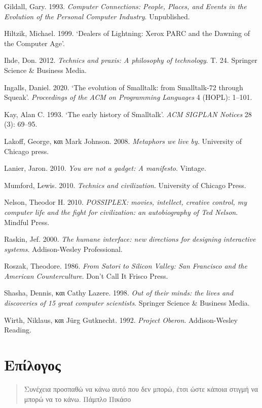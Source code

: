 \documentclass[
]{article}
\begin{document}
Gildall, Gary. 1993. \emph{Computer Connections: People, Places, and
Events in the Evolution of the Personal Computer Industry}. Unpublished.

Hiltzik, Michael. 1999. {`Dealers of Lightning: Xerox PARC and the
Dawning of the Computer Age'}.

Ihde, Don. 2012. \emph{Technics and praxis: A philosophy of technology}.
Τ. 24. Springer Science \& Business Media.

Ingalls, Daniel. 2020. {`The evolution of Smalltalk: from Smalltalk-72
through Squeak'}. \emph{Proceedings of the ACM on Programming Languages}
4 (HOPL): 1--101.

Kay, Alan C. 1993. {`The early history of Smalltalk'}. \emph{ACM SIGPLAN
Notices} 28 (3): 69--95.

Lakoff, George, και Mark Johnson. 2008. \emph{Metaphors we live by}.
University of Chicago press.

Lanier, Jaron. 2010. \emph{You are not a gadget: A manifesto}. Vintage.

Mumford, Lewis. 2010. \emph{Technics and civilization}. University of
Chicago Press.

Nelson, Theodor H. 2010. \emph{POSSIPLEX: movies, intellect, creative
control, my computer life and the fight for civilization: an
autobiography of Ted Nelson}. Mindful Press.

Raskin, Jef. 2000. \emph{The humane interface: new directions for
designing interactive systems}. Addison-Wesley Professional.

Roszak, Theodore. 1986. \emph{From Satori to Silicon Valley: San
Francisco and the American Counterculture}. Don't Call It Frisco Press.

Shasha, Dennis, και Cathy Lazere. 1998. \emph{Out of their minds: the
lives and discoveries of 15 great computer scientists}. Springer Science
\& Business Media.

Wirth, Niklaus, και Jürg Gutknecht. 1992. \emph{Project Oberon}.
Addison-Wesley Reading.

\hypertarget{ux3b5ux3c0ux3afux3bbux3bfux3b3ux3bfux3c2}{%
\section{Επίλογος}\label{ux3b5ux3c0ux3afux3bbux3bfux3b3ux3bfux3c2}}

\begin{quote}
Συνέχεια προσπαθώ να κάνω αυτό που δεν μπορώ, έτσι ώστε κάποια στιγμή να
μπορώ να το κάνω. Πάμπλο Πικάσο
\end{quote}
\end{document}
